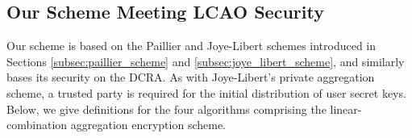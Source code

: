 \documentclass[10pt,letterpaper,oneside,twocolumn,journal]{IEEEtran}
\theoremstyle{definition}
\theoremstyle{definition}
\theoremstyle{remark}
\begin{document}
% 
% 

\subsection{Our Scheme Meeting LCAO Security} \label{subsec:our_scheme}
Our scheme is based on the Paillier and Joye-Libert schemes introduced in Sections \ref{subsec:paillier_scheme} and \ref{subsec:joye_libert_scheme}, and similarly bases its security on the DCRA. As with Joye-Libert's private aggregation scheme, a trusted party is required for the initial distribution of user secret keys. Below, we give definitions for the four algorithms comprising the linear-combination aggregation encryption scheme.
\end{document}
